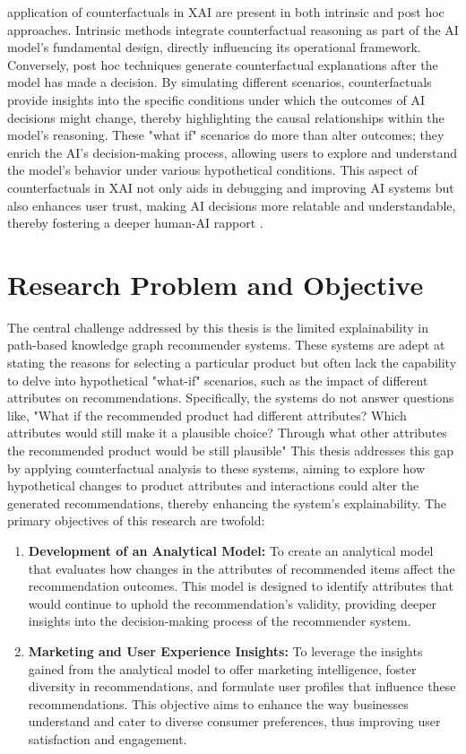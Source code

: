 application of counterfactuals in XAI are present in both intrinsic and post hoc
approaches. Intrinsic methods integrate counterfactual reasoning as part of the
AI model's fundamental design, directly influencing its operational framework.
Conversely, post hoc techniques generate counterfactual explanations after the model
has made a decision. By simulating different scenarios, counterfactuals provide insights
into the specific conditions under which the outcomes of AI decisions might change,
thereby highlighting the causal relationships within the model's reasoning. These
"what if" scenarios do more than alter outcomes; they enrich the AI's decision-making
process, allowing users to explore and understand the model's behavior under various
hypothetical conditions. This aspect of counterfactuals in XAI not only aids in
debugging and improving AI systems but also enhances user trust, making AI decisions
more relatable and understandable, thereby fostering a deeper human-AI rapport \textcite{byrne_counterfactuals_2019}.

\section{Research Problem and Objective}

The central challenge addressed by this thesis is the limited explainability in
path-based knowledge graph recommender systems. These systems are adept at stating
the reasons for selecting a particular product but often lack the capability to delve
into hypothetical "what-if" scenarios, such as the impact of different
attributes on recommendations. Specifically, the systems do not answer questions
like, "What if the recommended product had different attributes? Which attributes
would still make it a plausible choice? Through what other attributes the
recommended product would be still plausible" This thesis addresses this gap by applying
counterfactual analysis to these systems, aiming to explore how hypothetical
changes to product attributes and interactions could alter the generated
recommendations, thereby enhancing the system's explainability. The primary
objectives of this research are twofold:

\begin{enumerate}
	\item \textbf{Development of an Analytical Model:} To create an analytical
		model that evaluates how changes in the attributes of recommended items
		affect the recommendation outcomes. This model is designed to identify attributes
		that would continue to uphold the recommendation's validity, providing
		deeper insights into the decision-making process of the recommender system.

	\item \textbf{Marketing and User Experience Insights:} To leverage the
		insights gained from the analytical model to offer marketing intelligence, foster
		diversity in recommendations, and formulate user profiles that influence
		these recommendations. This objective aims to enhance the way businesses understand
		and cater to diverse consumer preferences, thus improving user satisfaction
		and engagement.
\end{enumerate}

